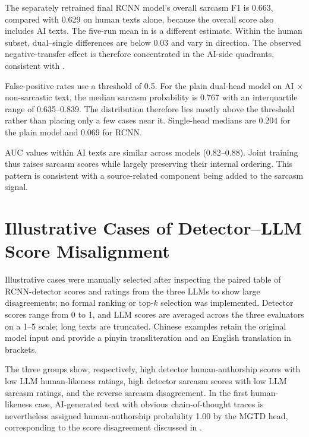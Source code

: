 The separately retrained final RCNN model's overall sarcasm F1 is 0.663, compared with 0.629 on human texts alone, because the overall score also includes AI texts. The five-run mean in  is a different estimate. Within the human subset, dual--single differences are below 0.03 and vary in direction. The observed negative-transfer effect is therefore concentrated in the AI-side quadrants, consistent with .

False-positive rates use a threshold of 0.5. For the plain dual-head model on AI $\times$ non-sarcastic text, the median sarcasm probability is 0.767 with an interquartile range of 0.635--0.839. The distribution therefore lies mostly above the threshold rather than placing only a few cases near it. Single-head medians are 0.204 for the plain model and 0.069 for RCNN.

AUC values within AI texts are similar across models (0.82--0.88). Joint training thus raises sarcasm scores while largely preserving their internal ordering. This pattern is consistent with a source-related component being added to the sarcasm signal.

\section{Illustrative Cases of Detector--LLM Score Misalignment}
\label{app:cases}

Illustrative cases were manually selected after inspecting the paired table of RCNN-detector scores and ratings from the three LLMs to show large disagreements; no formal ranking or top-$k$ selection was implemented. Detector scores range from 0 to 1, and LLM scores are averaged across the three evaluators on a 1--5 scale; long texts are truncated. Chinese examples retain the original model input and provide a pinyin transliteration and an English translation in brackets.

The three groups show, respectively, high detector human-authorship scores with low LLM human-likeness ratings, high detector sarcasm scores with low LLM sarcasm ratings, and the reverse sarcasm disagreement. In the first human-likeness case, AI-generated text with obvious chain-of-thought traces is nevertheless assigned human-authorship probability 1.00 by the MGTD head, corresponding to the score disagreement discussed in .

